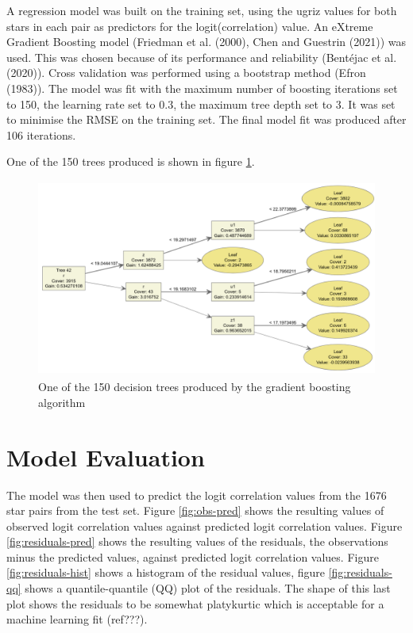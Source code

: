 \documentclass[]{elsarticle} %
\begin{document}
A regression model was built on the training set, using the ugriz values
for both stars in each pair as predictors for the logit(correlation)
value. An eXtreme Gradient Boosting model (Friedman et al. (2000), Chen
and Guestrin (2021)) was used. This was chosen because of its
performance and reliability (Bentéjac et al. (2020)). Cross validation
was performed using a bootstrap method (Efron (1983)). The model was fit
with the maximum number of boosting iterations set to 150, the learning
rate set to 0.3, the maximum tree depth set to 3. It was set to minimise
the RMSE on the training set. The final model fit was produced after 106
iterations.

One of the 150 trees produced is shown in figure \ref{fig:tree}.

\begin{figure}
  \includegraphics[width=\columnwidth, height = 6.5cm]{figures/tree}
    \caption{One of the 150 decision trees produced by the gradient boosting algorithm}
    \label{fig:tree}
\end{figure}

\hypertarget{model-evaluation}{%
\section{Model Evaluation}\label{model-evaluation}}

The model was then used to predict the logit correlation values from the
1676 star pairs from the test set. Figure \ref{fig:obs-pred} shows the
resulting values of observed logit correlation values against predicted
logit correlation values. Figure \ref{fig:residuals-pred} shows the
resulting values of the residuals, the observations minus the predicted
values, against predicted logit correlation values. Figure
\ref{fig:residuals-hist} shows a histogram of the residual values,
figure \ref{fig:residuals-qq} shows a quantile-quantile (QQ) plot of the
residuals. The shape of this last plot shows the residuals to be
somewhat platykurtic which is acceptable for a machine learning fit
(ref???).
\end{document}
